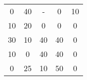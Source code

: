 \begin{tabular}{ccccc}
\rowcolor[rgb]{ .749,  .749,  .749} 0      & 40     & -      & \cellcolor[rgb]{ .929,  .49,  .192} 0 & 10 \\
\rowcolor[rgb]{ .749,  .749,  .749} 10     & 20     & \cellcolor[rgb]{ .929,  .49,  .192} 0 & 0      & 0 \\
30     & 10     & 40     & 40     & \cellcolor[rgb]{ .929,  .49,  .192} 0 \\
\rowcolor[rgb]{ .749,  .749,  .749} 10     & \cellcolor[rgb]{ .929,  .49,  .192} 0 & 40     & 40     & 0 \\
\rowcolor[rgb]{ .929,  .49,  .192} 0      & \cellcolor[rgb]{ .749,  .749,  .749} 25 & \cellcolor[rgb]{ .749,  .749,  .749} 10 & \cellcolor[rgb]{ .749,  .749,  .749} 50 & \cellcolor[rgb]{ .749,  .749,  .749} 0 \bigstrut[b]\\
\hline
\hline
\end{tabular}%
